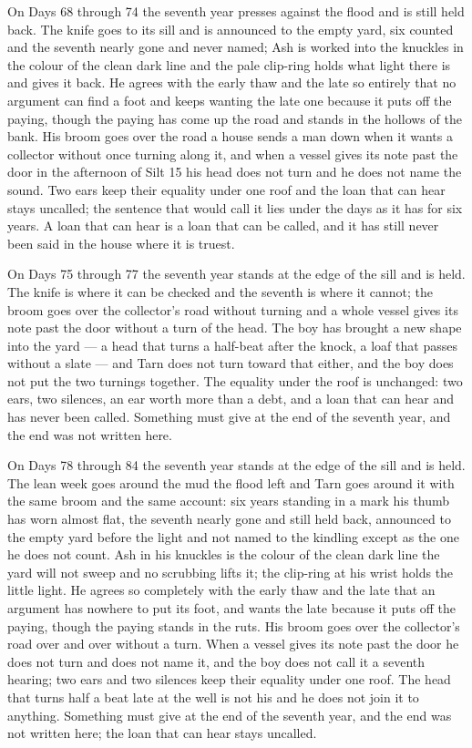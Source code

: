 \documentclass{design/chronicle}
\begin{document}
{On Days 68 through 74 the seventh year presses against the flood and is still held back. The knife goes to its sill and is announced to the empty yard, six counted and the seventh nearly gone and never named; Ash is worked into the knuckles in the colour of the clean dark line and the pale clip-ring holds what light there is and gives it back. He agrees with the early thaw and the late so entirely that no argument can find a foot and keeps wanting the late one because it puts off the paying, though the paying has come up the road and stands in the hollows of the bank. His broom goes over the road a house sends a man down when it wants a collector without once turning along it, and when a vessel gives its note past the door in the afternoon of Silt 15 his head does not turn and he does not name the sound. Two ears keep their equality under one roof and the loan that can hear stays uncalled; the sentence that would call it lies under the days as it has for six years. A loan that can hear is a loan that can be called, and it has still never been said in the house where it is truest.

On Days 75 through 77 the seventh year stands at the edge of the sill and is held. The knife is where it can be checked and the seventh is where it cannot; the broom goes over the collector’s road without turning and a whole vessel gives its note past the door without a turn of the head. The boy has brought a new shape into the yard --- a head that turns a half-beat after the knock, a loaf that passes without a slate --- and Tarn does not turn toward that either, and the boy does not put the two turnings together. The equality under the roof is unchanged: two ears, two silences, an ear worth more than a debt, and a loan that can hear and has never been called. Something must give at the end of the seventh year, and the end was not written here.

On Days 78 through 84 the seventh year stands at the edge of the sill and is held. The lean week goes around the mud the flood left and Tarn goes around it with the same broom and the same account: six years standing in a mark his thumb has worn almost flat, the seventh nearly gone and still held back, announced to the empty yard before the light and not named to the kindling except as the one he does not count. Ash in his knuckles is the colour of the clean dark line the yard will not sweep and no scrubbing lifts it; the clip-ring at his wrist holds the little light. He agrees so completely with the early thaw and the late that an argument has nowhere to put its foot, and wants the late because it puts off the paying, though the paying stands in the ruts. His broom goes over the collector’s road over and over without a turn. When a vessel gives its note past the door he does not turn and does not name it, and the boy does not call it a seventh hearing; two ears and two silences keep their equality under one roof. The head that turns half a beat late at the well is not his and he does not join it to anything. Something must give at the end of the seventh year, and the end was not written here; the loan that can hear stays uncalled.

}
\end{document}
